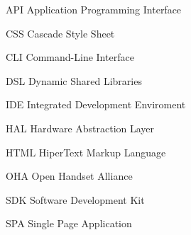 \begin{siglas}
  
  \item[API] Application Programming Interface
  \item[CSS] Cascade Style Sheet
  \item[CLI] Command-Line Interface
  \item[DSL] Dynamic Shared Libraries
  \item[IDE] Integrated Development Enviroment
  \item[HAL] Hardware Abstraction Layer
  \item[HTML] HiperText Markup Language
  \item[OHA] Open Handset Alliance
  \item[SDK] Software Development Kit
  \item[SPA] Single Page Application
    
\end{siglas}
